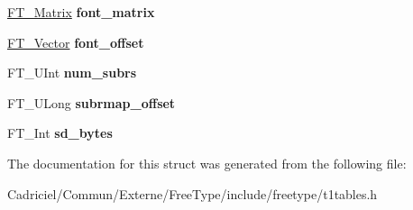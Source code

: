 \begin{DoxyCompactItemize}
\item 
\hyperlink{struct_f_t___matrix__}{F\+T\+\_\+\+Matrix} {\bfseries font\+\_\+matrix}\hypertarget{struct_c_i_d___face_dict_rec___aa418f6ce40b7574b6234e0ab48377e4b}{}\label{struct_c_i_d___face_dict_rec___aa418f6ce40b7574b6234e0ab48377e4b}

\item 
\hyperlink{struct_f_t___vector__}{F\+T\+\_\+\+Vector} {\bfseries font\+\_\+offset}\hypertarget{struct_c_i_d___face_dict_rec___aa62daa8d45ed4a817f1207cbd452d61e}{}\label{struct_c_i_d___face_dict_rec___aa62daa8d45ed4a817f1207cbd452d61e}

\item 
F\+T\+\_\+\+U\+Int {\bfseries num\+\_\+subrs}\hypertarget{struct_c_i_d___face_dict_rec___a611c406c8d7cd2e37d077070f4bb3ebe}{}\label{struct_c_i_d___face_dict_rec___a611c406c8d7cd2e37d077070f4bb3ebe}

\item 
F\+T\+\_\+\+U\+Long {\bfseries subrmap\+\_\+offset}\hypertarget{struct_c_i_d___face_dict_rec___a45d58111727af70018289e7c5b64ba8c}{}\label{struct_c_i_d___face_dict_rec___a45d58111727af70018289e7c5b64ba8c}

\item 
F\+T\+\_\+\+Int {\bfseries sd\+\_\+bytes}\hypertarget{struct_c_i_d___face_dict_rec___aecdf98f9671f22c1715ec929b77767ce}{}\label{struct_c_i_d___face_dict_rec___aecdf98f9671f22c1715ec929b77767ce}

\end{DoxyCompactItemize}


The documentation for this struct was generated from the following file\+:\begin{DoxyCompactItemize}
\item 
Cadriciel/\+Commun/\+Externe/\+Free\+Type/include/freetype/t1tables.\+h\end{DoxyCompactItemize}
